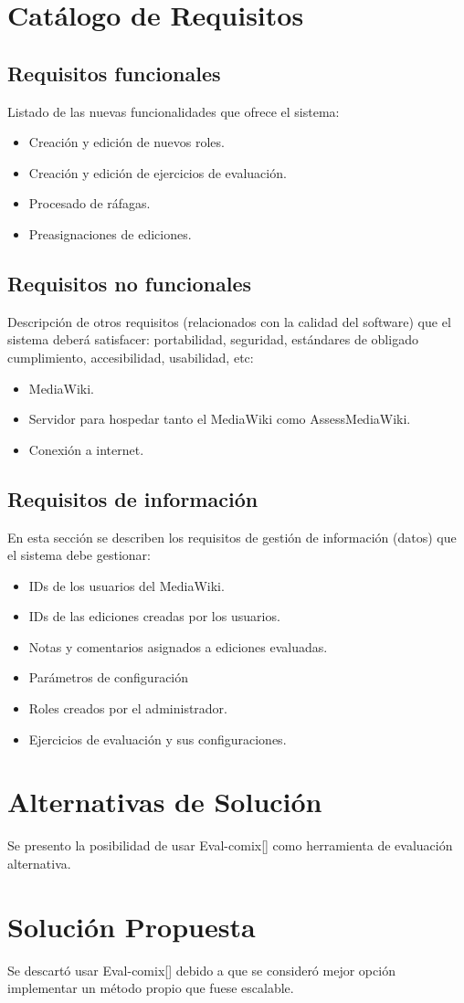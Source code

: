 \section{Catálogo de Requisitos}

\subsection{Requisitos funcionales}
Listado de las nuevas funcionalidades que ofrece el sistema:

\begin{itemize}
	\item Creación y edición de nuevos roles.
	\item Creación y edición de ejercicios de evaluación.
	\item Procesado de ráfagas.
	\item Preasignaciones de ediciones.
\end{itemize}

\subsection{Requisitos no funcionales}
Descripción de otros requisitos (relacionados con la calidad del software) que el sistema deberá satisfacer: portabilidad, seguridad, estándares de obligado cumplimiento, accesibilidad, usabilidad, etc:
\begin{itemize}
	\item MediaWiki.
	\item Servidor para hospedar tanto el MediaWiki como AssessMediaWiki.
	\item Conexión a internet.
\end{itemize}

\subsection{Requisitos de información}
En esta sección se describen los requisitos de gestión de información (datos) que el sistema debe gestionar:
\begin{itemize}
	\item IDs de los usuarios del MediaWiki.
	\item IDs de las ediciones creadas por los usuarios.
	\item Notas y comentarios asignados a ediciones evaluadas.
	\item Parámetros de configuración
	\item Roles creados por el administrador.
	\item Ejercicios de evaluación y sus configuraciones.
\end{itemize}

\section{Alternativas de Solución}
Se presento la posibilidad de usar Eval-comix[] como herramienta de evaluación alternativa.

\section{Solución Propuesta}
Se descartó usar Eval-comix[] debido a que se consideró mejor opción implementar un método propio que fuese escalable.